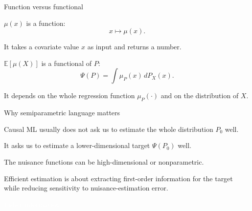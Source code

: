 \documentclass[xcolor={table}, handout]{beamer}
\begin{document}
\note{
\scriptsize \singlespacing

}
\begin{frame}{Function versus functional}

\begin{wideitemize}
\item $\mu(x)$ is a function:
\[
x \mapsto \mu(x).
\]\pause
\item It takes a covariate value $x$ as input and returns a number.\pause
\item $\mathbb{E}[\mu(X)]$ is a functional of $P$:
\[
\Psi(P)
  =
  \int \mu_P(x)\,dP_X(x).
\]\pause
\item It depends on the whole regression function $\mu_P(\cdot)$ and on the distribution of $X$.
\end{wideitemize}

\end{frame}

\note{
\scriptsize \singlespacing

}
\begin{frame}{Why semiparametric language matters}

\begin{wideitemize}
\item Causal ML usually does not ask us to estimate the whole distribution $P_0$ well.\pause
\item It asks us to estimate a lower-dimensional target $\Psi(P_0)$ well.\pause
\item The nuisance functions can be high-dimensional or nonparametric.\pause
\item Efficient estimation is about extracting first-order information for the target while reducing sensitivity to nuisance-estimation error.
\end{wideitemize}

\end{frame}

\note{
\scriptsize \singlespacing

}
\begin{transitionframe}
\centering

\LARGE \textcolor{white}{Fisher information.}

\end{transitionframe}
\end{document}

